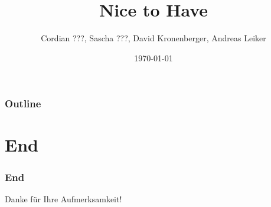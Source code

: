 \documentclass[envcountsect]{beamer}
\title{Nice to Have}
\author{Cordian ???, Sascha ???, David Kronenberger, Andreas Leiker}
\date{\today\vspace*{\fill}}
\begin{document}
\begin{frame}
\titlepage
\end{frame}

\begin{frame}
\frametitle{Outline}
\tableofcontents
\end{frame}






\section*{End}

\begin{frame}
\frametitle{End}

\begin{center}
Danke für Ihre Aufmerksamkeit!
\end{center}
\end{frame}



\end{document}
